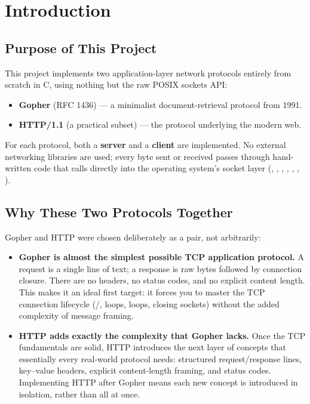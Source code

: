 \chapter{Introduction}

\section{Purpose of This Project}

This project implements two application-layer network protocols entirely from scratch in C, using nothing but the raw POSIX sockets API:

\begin{itemize}
    \item \textbf{Gopher} (RFC 1436) --- a minimalist document-retrieval protocol from 1991.
    \item \textbf{HTTP/1.1} (a practical subset) --- the protocol underlying the modern web.
\end{itemize}

For each protocol, both a \textbf{server} and a \textbf{client} are implemented. No external networking libraries are used; every byte sent or received passes through hand-written code that calls directly into the operating system's socket layer (, , , , , , ).

\section{Why These Two Protocols Together}

Gopher and HTTP were chosen deliberately as a pair, not arbitrarily:

\begin{itemize}
    \item \textbf{Gopher is almost the simplest possible TCP application protocol.} A request is a single line of text; a response is raw bytes followed by connection closure. There are no headers, no status codes, and no explicit content length. This makes it an ideal first target: it forces you to master the TCP connection lifecycle (/,  loops,  loops, closing sockets) without the added complexity of message framing.

    \item \textbf{HTTP adds exactly the complexity that Gopher lacks.} Once the TCP fundamentals are solid, HTTP introduces the next layer of concepts that essentially every real-world protocol needs: structured request/response lines, key--value headers, explicit content-length framing, and status codes. Implementing HTTP after Gopher means each new concept is introduced in isolation, rather than all at once.
\end{itemize}

